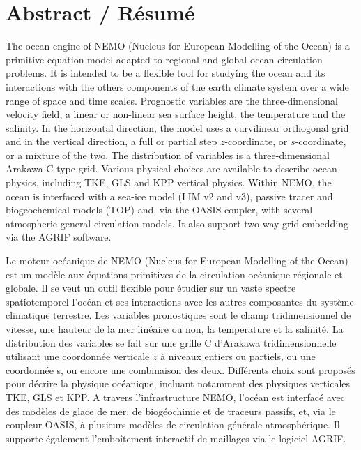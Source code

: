 

\chapter*{Abstract / R\'{e}sum\'{e}}

\vspace{-40pt}

{\small
The ocean engine of NEMO (Nucleus for European Modelling of the Ocean) is a primitive
equation model adapted to regional and global ocean circulation problems. It is intended to
be a flexible tool for studying the ocean and its interactions with the others components of
the earth climate system over a wide range of space and time scales.
Prognostic variables are the three-dimensional velocity field, a linear
or non-linear sea surface height, the temperature and the salinity. In the horizontal direction,
the model uses a curvilinear orthogonal grid and in the vertical direction, a full or partial step
$z$-coordinate, or $s$-coordinate, or a mixture of the two. The distribution of variables is a
three-dimensional Arakawa C-type grid. Various physical choices are available to describe
ocean physics, including TKE, GLS and KPP vertical physics. Within NEMO, the ocean is
interfaced with a sea-ice model (LIM v2 and v3), passive tracer and biogeochemical models (TOP)
and, via the OASIS coupler, with several atmospheric general circulation models. It also
support two-way grid embedding via the AGRIF software.

 \vspace{0.5cm}

Le moteur oc\'{e}anique de NEMO (Nucleus for European Modelling of the Ocean) est un
mod\`{e}le aux \'{e}quations primitives de la circulation oc\'{e}anique r\'{e}gionale et globale.
Il se veut un outil flexible pour \'{e}tudier sur un vaste spectre spatiotemporel l'oc\'{e}an et ses
interactions avec les autres composantes du syst\`{e}me climatique terrestre.
Les variables pronostiques sont le champ tridimensionnel de vitesse, une hauteur de la mer
lin\'{e}aire ou non, la temperature et la salinit\'{e}.
La distribution des variables se fait sur une grille C d'Arakawa tridimensionnelle utilisant une
coordonn\'{e}e verticale $z$ \`{a} niveaux entiers ou partiels, ou une coordonn\'{e}e s, ou encore
une combinaison des deux. Diff\'{e}rents choix sont propos\'{e}s pour d\'{e}crire la physique
oc\'{e}anique, incluant notamment des physiques verticales TKE, GLS et KPP. A travers l'infrastructure
NEMO, l'oc\'{e}an est interfac\'{e} avec des mod\`{e}les de glace de mer, de biog\'{e}ochimie
et de traceurs passifs, et, via le coupleur OASIS, \`{a} plusieurs mod\`{e}les de circulation
g\'{e}n\'{e}rale atmosph\'{e}rique. Il supporte \'{e}galement l'embo\^{i}tement interactif de
maillages via le logiciel AGRIF.
}


